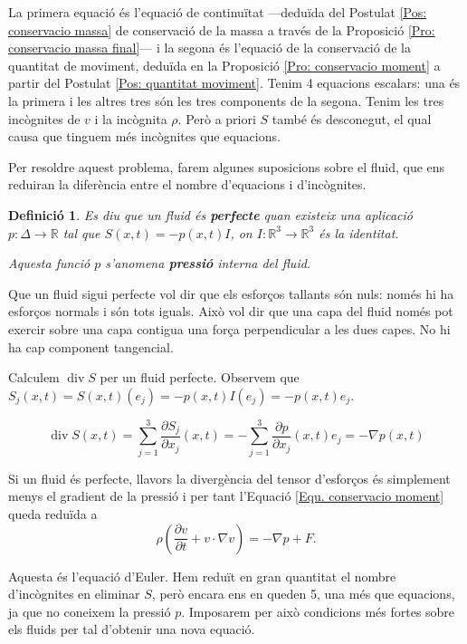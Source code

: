 \documentclass{article}
\numberwithin{equation}{section}
\DeclareMathOperator{\diver}{div}
\newtheorem{definicio}{Definici\'{o}}[section]
\begin{document}
La primera equaci\'{o} \'{e}s l'equaci\'{o} de continu\"{i}tat ---dedu\"{i}da del Postulat \ref{Pos: conservacio massa} de conservaci\'{o} de la massa a trav\'{e}s de la Proposici\'{o} \ref{Pro: conservacio massa final}--- i la segona \'{e}s l'equaci\'{o} de la conservaci\'{o} de la quantitat de moviment, dedu\"{i}da en la Proposici\'{o} \ref{Pro: conservacio moment} a partir del Postulat \ref{Pos: quantitat moviment}. Tenim 4 equacions escalars: una \'{e}s la primera i les altres tres s\'{o}n les tres components de la segona. Tenim les tres inc\`{o}gnites de $v$ i la inc\`{o}gnita $\rho$. Per\`{o} a priori $S$ tamb\'{e} \'{e}s desconegut, el qual causa que tinguem m\'{e}s inc\`{o}gnites que equacions.

Per resoldre aquest problema, farem algunes suposicions sobre el fluid, que ens reduiran la difer\`{e}ncia entre el nombre d'equacions i d'inc\`{o}gnites.

\begin{definicio}
Es diu que un fluid \'{e}s \textbf{perfecte} quan existeix una aplicaci\'{o} $p:\Delta\rightarrow\mathbb{R}$ tal que $S(x,t)=-p(x,t)I$, on $I:\mathbb{R}^3\rightarrow\mathbb{R}^3$ \'{e}s la identitat.

Aquesta funci\'{o} $p$ s'anomena \textbf{pressi\'{o}} interna del fluid.
\end{definicio}

Que un fluid sigui perfecte vol dir que els esfor\c{c}os tallants s\'{o}n nuls: nom\'{e}s hi ha esfor\c{c}os normals i s\'{o}n tots iguals. Aix\`{o} vol dir que una capa del fluid nom\'{e}s pot exercir sobre una capa contigua una for\c{c}a perpendicular a les dues capes. No hi ha cap component tangencial.

Calculem $\diver S$ per un fluid perfecte. Observem que $S_j(x,t)=S(x,t)(e_j)=-p(x,t)I(e_j)=-p(x,t)e_j$.

\[\diver S(x,t)=\sum_{j=1}^3\frac{\partial S_j}{\partial x_j}(x,t)=-\sum_{j=1}^3\frac{\partial p}{\partial x_j}(x,t)e_j=-\nabla p(x,t)\]

Si un fluid \'{e}s perfecte, llavors la diverg\`{e}ncia del tensor d'esfor\c{c}os \'{e}s simplement menys el gradient de la pressi\'{o} i per tant l'Equaci\'{o} \eqref{Equ. conservacio moment} queda redu\"{i}da a
\begin{equation}\label{Equ. Euler perfecte}
\rho\left(\frac{\partial v}{\partial t}+v\cdot\nabla v\right)=-\nabla p+F.
\end{equation}

Aquesta \'{e}s l'equaci\'{o} d'Euler. Hem redu\"{i}t en gran quantitat el nombre d'inc\`{o}gnites en eliminar $S$, per\`{o} encara ens en queden 5, una m\'{e}s que equacions, ja que no coneixem la pressi\'{o} $p$. Imposarem per aix\`{o} condicions m\'{e}s fortes sobre els fluids per tal d'obtenir una nova equaci\'{o}.
\end{document}

